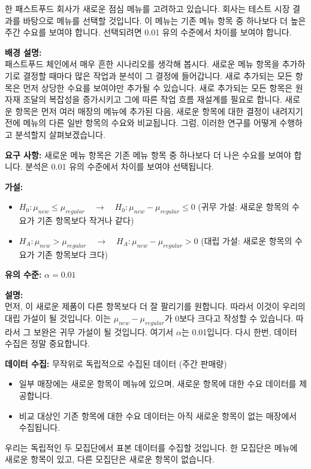 \documentclass[11pt,a4paper]{article}
\begin{document}
\begin{examplebox}[title=제품 테스트 (1/5): 새로운 점심 메뉴 도입]
한 패스트푸드 회사가 새로운 점심 메뉴를 고려하고 있습니다. 회사는 테스트 시장 결과를 바탕으로 메뉴를 선택할 것입니다. 이 메뉴는 기존 메뉴 항목 중 하나보다 더 높은 주간 수요를 보여야 합니다. 선택되려면 0.01 유의 수준에서 차이를 보여야 합니다.

\textbf{배경 설명:} \\
패스트푸드 체인에서 매우 흔한 시나리오를 생각해 봅시다. 새로운 메뉴 항목을 추가하기로 결정할 때마다 많은 작업과 분석이 그 결정에 들어갑니다. 새로 추가되는 모든 항목은 먼저 상당한 수요를 보여야만 추가될 수 있습니다. 새로 추가되는 모든 항목은 원자재 조달의 복잡성을 증가시키고 그에 따른 작업 흐름 재설계를 필요로 합니다. 새로운 항목은 먼저 여러 매장의 메뉴에 추가된 다음, 새로운 항목에 대한 결정이 내려지기 전에 메뉴의 다른 일반 항목의 수요와 비교됩니다. 그럼, 이러한 연구를 어떻게 수행하고 분석할지 살펴보겠습니다.
\end{examplebox}

\begin{tcolorbox}[mybox, title=제품 테스트 (2/5): 가설 설정 (새 메뉴)]
\textbf{요구 사항:} 새로운 메뉴 항목은 기존 메뉴 항목 중 하나보다 더 나은 수요를 보여야 합니다. 분석은 0.01 유의 수준에서 차이를 보여야 선택됩니다.

\textbf{가설:}
\begin{itemize}
    \item $H_0 : \mu_{new} \le \mu_{regular} \quad \rightarrow \quad H_0 : \mu_{new} - \mu_{regular} \le 0$ (귀무 가설: 새로운 항목의 수요가 기존 항목보다 작거나 같다)
    \item $H_A : \mu_{new} > \mu_{regular} \quad \rightarrow \quad H_A : \mu_{new} - \mu_{regular} > 0$ (대립 가설: 새로운 항목의 수요가 기존 항목보다 크다)
\end{itemize}
\textbf{유의 수준:} $\alpha = 0.01$

\textbf{설명:} \\
먼저, 이 새로운 제품이 다른 항목보다 더 잘 팔리기를 원합니다. 따라서 이것이 우리의 대립 가설이 될 것입니다. 이는 $\mu_{new} - \mu_{regular}$가 0보다 크다고 작성할 수 있습니다. 따라서 그 보완은 귀무 가설이 될 것입니다. 여기서 $\alpha$는 0.01입니다. 다시 한번, 데이터 수집은 정말 중요합니다.
\end{tcolorbox}

\begin{tcolorbox}[mybox, title=제품 테스트 (3/5): 데이터 수집 방법]
\textbf{데이터 수집:} 무작위로 독립적으로 수집된 데이터 (주간 판매량)
\begin{itemize}
    \item 일부 매장에는 새로운 항목이 메뉴에 있으며, 새로운 항목에 대한 수요 데이터를 제공합니다.
    \item 비교 대상인 기존 항목에 대한 수요 데이터는 아직 새로운 항목이 없는 매장에서 수집됩니다.
\end{itemize}
우리는 독립적인 두 모집단에서 표본 데이터를 수집할 것입니다. 한 모집단은 메뉴에 새로운 항목이 있고, 다른 모집단은 새로운 항목이 없습니다.
\end{tcolorbox}
\end{document}
